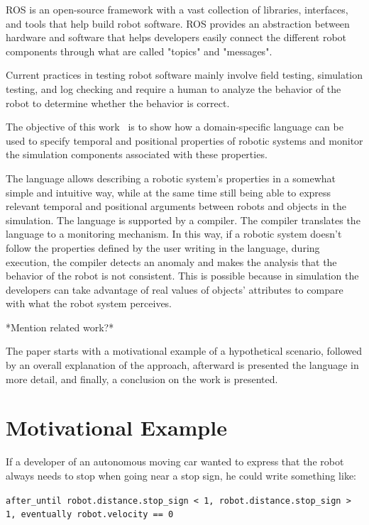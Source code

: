 \documentclass[runningheads]{llncs}
\begin{document}
ROS is an open-source framework with a vast collection of libraries, interfaces, and tools that help build robot software. ROS provides an abstraction between hardware and software that helps developers easily connect the different robot components through what are called "topics" and "messages".

Current practices in testing robot software mainly involve field testing, simulation testing, and log checking and require a human to analyze the behavior of the robot to determine whether the behavior is correct.

The objective of this work~\cite{github_repo} is to show how a domain-specific language can be used to specify temporal and positional properties of robotic systems and monitor the simulation components associated with these properties.

The language allows describing a robotic system's properties in a somewhat simple and intuitive way, while at the same time still being able to express relevant temporal and positional arguments between robots and objects in the simulation. The language is supported by a compiler. The compiler translates the language to a monitoring mechanism. In this way, if a robotic system doesn't follow the properties defined by the user writing in the language, during execution, the compiler detects an anomaly and makes the analysis that the behavior of the robot is not consistent. This is possible because in simulation the developers can take advantage of real values of objects' attributes to compare with what the robot system perceives.

*Mention related work?*

The paper starts with a motivational example of a hypothetical scenario, followed by an overall explanation of the approach, afterward is presented the language in more detail, and finally, a conclusion on the work is presented.

\section{Motivational Example}

If a developer of an autonomous moving car wanted to express that the robot always needs to stop when going near a stop sign, he could write something like:

\vspace{3mm}

\texttt{after\_until robot.distance.stop\_sign < 1, robot.distance.stop\_sign > 1, eventually robot.velocity == 0}
\end{document}
